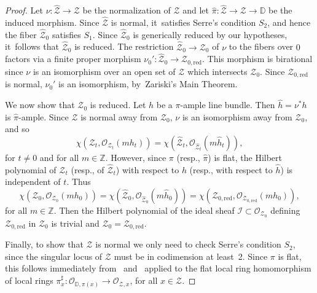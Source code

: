 \documentclass[11pt]{article}
\newcommand{\DD}{{\mathbb D}}
\newcommand{\ZZ}{{\mathbb Z}}\let\Z\ZZ
\newcommand\cO{\mathcal{O}}
\theoremstyle{definition}
\def\citestacks#1{\cite[\href{https://stacks.math.columbia.edu/tag/#1}{Tag #1}]{stacks-project}}
\begin{document}
\begin{proof}
Let $\nu\colon\widehat{\mathcal{Z}}\to\mathcal{Z}$ be the normalization of $\mathcal{Z}$ and let $\widehat{\pi}\colon \widehat{\mathcal{Z}} \to \mathcal{Z} \to \DD$ be the induced morphism.
Since $\widehat{\mathcal{Z}}$ is normal, it~satisfies Serre's condition $S_2$, and hence the fiber $\widehat{\mathcal{Z}}_0$ satisfies $S_1$.
Since $\widehat{\mathcal{Z}}_0$ is generically reduced by our hypotheses, it~follows that $\widehat{\mathcal{Z}}_0$ is reduced.
The restriction $\widehat{\mathcal{Z}}_0 \to \mathcal{Z}_0$ of $\nu$ to the fibers over $0$ factors via a finite proper morphism $\nu_0': \widehat{\mathcal{Z}}_0 \to \mathcal{Z}_{0,\mathrm{red}}$.
This morphism is birational since $\nu$ is an isomorphism over an open set of $\mathcal{Z}$ which intersects $\mathcal{Z}_0$.
Since $\mathcal{Z}_{0,\mathrm{red}}$ is normal, $\nu_0'$ is an isomorphism, by~Zariski's Main Theorem.

We now show that $\mathcal{Z}_0$ is reduced.
Let $h$ be a $\pi$-ample line bundle.
Then $\widehat{h}=\nu^* h$ is $\widehat{\pi}$-ample.
Since $\mathcal{Z}$ is normal away from $\mathcal{Z}_0$, $\nu$ is an isomorphism away from $\mathcal{Z}_0$, and so
\[
\chi(\mathcal{Z}_t,\mathcal{O}_{\mathcal{Z}_t}(mh_t))=\chi(\widehat{\mathcal{Z}}_t,\mathcal{O}_{\widehat{\mathcal{Z}}_t} (m\widehat{h}_t)),
\]
for $t \neq 0$ and for all $m\in\ZZ$.
However, since $\pi$ (resp., $\widehat{\pi}$) is flat, the Hilbert polynomial of $\mathcal{Z}_t$ (resp., of $\widehat{\mathcal{Z}}_t$) with respect to $h$ (resp., with respect to $\widehat{h}$) is independent of $t$.
Thus
\[
\chi(\mathcal{Z}_0,\mathcal{O}_{\mathcal{Z}_0}(mh_0))=\chi(\widehat{\mathcal{Z}}_0,\mathcal{O}_{\widehat{\mathcal{Z}}_0} (m\widehat{h}_0))=\chi(\mathcal{Z}_{0,\mathrm{red}},\mathcal{O}_{\mathcal{Z}_{0,\mathrm{red}}}(mh_0)),
\]
for all $m\in\ZZ$.
Then the Hilbert polynomial of the ideal sheaf $\mathcal{I} \subset \mathcal{O}_{\mathcal{Z}_0}$ defining $\mathcal{Z}_{0,\mathrm{red}}$ in $\mathcal{Z}_0$ is trivial and $\mathcal{Z}_0=\mathcal{Z}_{0,\mathrm{red}}$.

Finally, to show that $\mathcal{Z}$ is normal we only need to check Serre's condition $S_2$, since the singular locus of $\mathcal{Z}$ must be in codimension at least~2.
Since $\pi$ is flat, this follows immediately from~\citestacks{00ON} and~\citestacks{0337} applied to the flat local ring homomorphism of local rings $\pi_x^{\sharp}\colon\cO_{\DD,\pi(x)}\to \cO_{\mathcal{Z},x}$, for all $x\in \mathcal{Z}$.
\end{proof}
\end{document}
